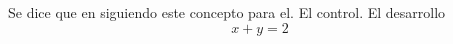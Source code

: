 \documentclass[11pt,a4paper]{book}
\begin{document}
 Se dice que  en \cite{khalil:2002} siguiendo este concepto para el. El control.
  El desarrollo
\begin{equation}
    x+y=2
\end{equation}


\end{document}
